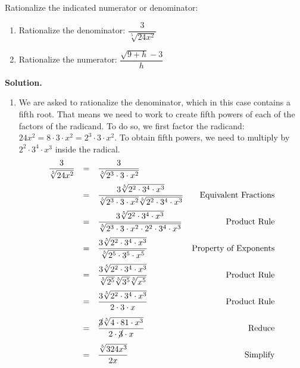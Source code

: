\documentclass{ximera}
\begin{document}
\begin{example} \label{rationalizenumdenom} Rationalize the indicated numerator or denominator:

\begin{multicols}{2}
\begin{enumerate}

\item  Rationalize the denominator:  $\dfrac{3}{\sqrt[5]{24x^2}}$

\item  Rationalize the numerator: $\dfrac{\sqrt{9 + h} - 3}{h}$

\setcounter{HW}{\value{enumi}}

\end{enumerate}
\end{multicols}

{\bf Solution.}

\begin{enumerate}

\item We are asked to rationalize the denominator, which in this case contains a fifth root.  That means we need to work to create fifth powers of each of the factors of the radicand.  To do so, we first factor the radicand:  $24x^2 = 8 \cdot 3 \cdot x^2 = 2^3 \cdot 3 \cdot x^2$.  To obtain fifth powers, we need to multiply by $2^2 \cdot 3^4 \cdot x^3$ inside the radical.  \[ \begin{array}{rclr}

\dfrac{3}{\sqrt[5]{24x^2}} & = & \dfrac{3}{\sqrt[5]{2^3 \cdot 3 \cdot x^2}} & \\ [12pt]
                           & = & \dfrac{3 \sqrt[5]{2^2 \cdot 3^4 \cdot x^3}}{\sqrt[5]{2^3 \cdot 3 \cdot x^2}\sqrt[5]{2^2 \cdot 3^4 \cdot x^3}} & \text{Equivalent Fractions} \\[12pt]
												& = & \dfrac{3 \sqrt[5]{2^2 \cdot 3^4 \cdot x^3}}{\sqrt[5]{2^3 \cdot 3 \cdot x^2 \cdot 2^2 \cdot 3^4 \cdot x^3}} & \text{Product Rule} \\[12pt]
													& = & \dfrac{3 \sqrt[5]{2^2 \cdot 3^4 \cdot x^3}}{\sqrt[5]{2^5 \cdot 3^5 \cdot x^5}} & \text{Property of Exponents}\\[12pt]
													
													& = & \dfrac{3 \sqrt[5]{2^2 \cdot 3^4 \cdot x^3}}{\sqrt[5]{2^5} \sqrt[5]{3^5}\sqrt[5]{x^5}} & \text{Product Rule}\\[12pt]
                          & = & \dfrac{3 \sqrt[5]{2^2 \cdot 3^4\cdot x^3}}{2 \cdot 3 \cdot x} & \text{Product Rule}\\[12pt]
													& = & \dfrac{\cancel{3} \sqrt[5]{4 \cdot 81\cdot x^3}}{2 \cdot \cancel{3} \cdot x} & \text{Reduce}\\[12pt]
													& = & \dfrac{\sqrt[5]{324x^3}}{2x} & \text{Simplify}\\
													\end{array}\]
													

\end{enumerate}
\end{example}
\end{document}
